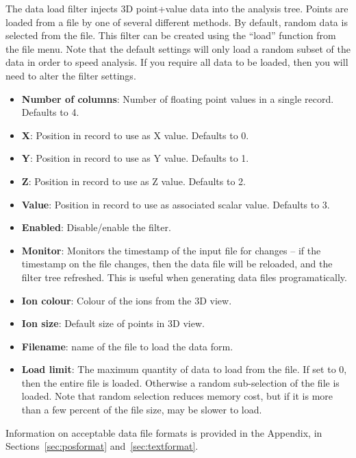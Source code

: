 \documentclass[10pt]{article}
\begin{document}
The data load filter injects 3D point+value data into the analysis tree. Points are loaded from a file by one of several different methods. By default, random data is selected from the file. This filter can be created using the ``load'' function from the file menu. Note that the default settings will only load a random subset of the data in order to speed analysis. If you require all data to be loaded, then you will need to alter the filter settings. 
\begin{itemize}
\item  \textbf{Number of columns}: Number of floating point values in a single record. Defaults to 4.
\item  \textbf{X}: Position in record to use as X value. Defaults to 0.
\item  \textbf{Y}: Position in record to use as Y value. Defaults to 1.
\item  \textbf{Z}: Position in record to use as Z value. Defaults to 2.
\item  \textbf{Value}: Position in record to use as associated scalar value. Defaults to 3.
\item \textbf{Enabled}: Disable/enable the filter.


\item \textbf{Monitor}: Monitors the timestamp of the input file for changes -- if the timestamp on the file changes, then the data file will be reloaded, and the filter tree refreshed. This is useful when generating data files programatically.
\item  \textbf{Ion colour}: Colour of the ions from the 3D view.
\item  \textbf{Ion size}: Default size of points in 3D view.
\item  \textbf{Filename}: name of the file to load the data form.
\item  \textbf{Load limit}: The maximum quantity of data to load from the file. If set to 0, then the entire file is loaded. Otherwise a random sub-selection of the file is loaded. Note that random selection reduces memory cost, but if it is more than a few percent of the file size, may be slower to load. 

\end{itemize}

Information on acceptable data file formats is provided in the Appendix, in Sections~\ref{sec:posformat} and~\ref{sec:textformat}.
\end{document}
